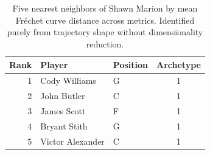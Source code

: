 \begin{table}[htbp]
  \centering\small
  \begin{tabular}{rllc}
    \toprule
    Rank & Player & Position & Archetype \\
    \midrule
    1 & Cody Williams & G & 1 \\
    2 & John Butler & C & 1 \\
    3 & James Scott & F & 1 \\
    4 & Bryant Stith & G & 1 \\
    5 & Victor Alexander & C & 1 \\
    \bottomrule
  \end{tabular}
  \caption{Five nearest neighbors of Shawn Marion by mean Fr\'{e}chet curve distance across metrics. Identified purely from trajectory shape without dimensionality reduction.}
  \label{tab:Shawn_Marion_frechet_curve_neighbors}
\end{table}

